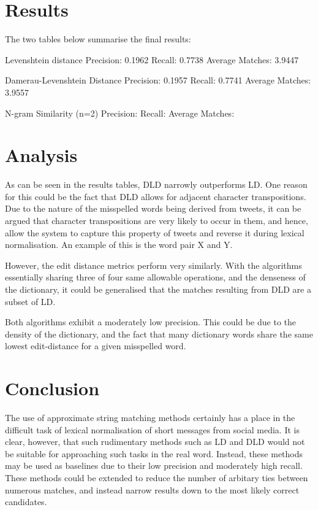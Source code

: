 \documentclass[11pt]{article}
\begin{document}
\section{Results}
The two tables below summarise the final results:

Levenshtein distance
Precision: 0.1962
Recall: 0.7738
Average Matches: 3.9447


Damerau-Levenshtein Distance
Precision: 0.1957
Recall: 0.7741
Average Matches: 3.9557

N-gram Similarity (n=2)
Precision:
Recall:
Average Matches:


\section{Analysis}
As can be seen in the results tables, DLD narrowly outperforms LD. One reason for this could be the fact that  DLD allows for adjacent character transpositions. Due to the nature of the misspelled words being derived from tweets, it can be argued that character transpositions are very likely to occur in them, and hence, allow the system to capture this property of tweets and reverse it during lexical normalisation. An example of this is the word pair X and Y.

However, the edit distance metrics perform very similarly. With the algorithms essentially sharing three of four same allowable operations, and the denseness of the dictionary, it could be generalised that the matches  resulting from DLD are a subset of LD.

Both algorithms exhibit a moderately low precision. This could be due to the density of the dictionary, and the fact that many dictionary words share the same lowest edit-distance for a given misspelled word.


\section{Conclusion}
The use of approximate string matching methods certainly has a place in the difficult task of lexical normalisation of short messages from social media. It is clear, however, that such rudimentary methods such as LD and DLD would not be suitable for approaching such tasks in the real word. Instead, these methods may be used as baselines due to their low precision and moderately high recall. These methods could be extended to reduce the number of arbitary ties between numerous matches, and instead narrow results down to the most likely correct candidates. 
\end{document}
